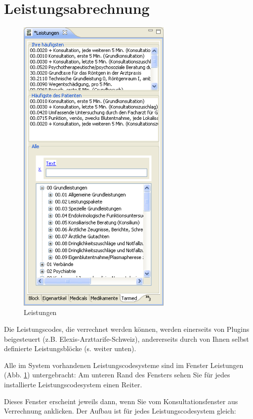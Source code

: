 \clearpage

\section{Leistungsabrechnung}
\label{concept:leistung}
\begin{figure}
    \includegraphics[width=7.5cm]{images/leistungen1}
    \caption{Leistungen}
    \label{fig:leistungen}
\end{figure}
Die Leistungscodes, die verrechnet werden können, werden einerseits von Plugins beigesteuert (z.B. Elexis-Arzttarife-Schweiz), andererseits durch von Ihnen selbst definierte Leistungsblöcke (s. weiter unten).

Alle im System vorhandenen Leistungscodesysteme sind im Fenster \glqq Leistungen\grqq{} (Abb. \ref{fig:leistungen}) untergebracht: Am unteren Rand des Fensters sehen Sie für jedes installierte Leistungscodesystem einen Reiter.

Dieses Fenster erscheint jeweils dann, wenn Sie vom Konsultationsfenster aus \glqq{}Verrechnung\grqq{} anklicken. Der Aufbau ist für jedes Leistungscodesystem gleich:

